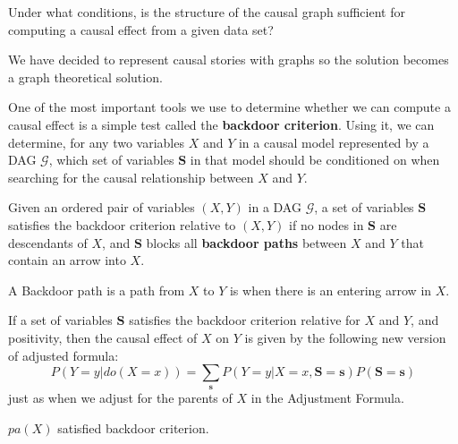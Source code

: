 \begin{center}
      Under what conditions, is the structure of the causal graph sufficient for
      computing a causal effect from a given data set?
\end{center}

We have decided to represent causal stories with graphs so the solution becomes
a graph theoretical solution.

One of the most important tools we use to determine whether we can compute a
causal effect is a simple test called the \textbf{backdoor criterion}. Using it,
we can determine, for any two variables $X$ and $Y$ in a causal model represented
by a DAG $\mathcal{G}$, which set of variables $\mathbf{S}$ in that model should
be conditioned on when searching for the causal relationship between $X$ and $Y$.

\begin{definition}
      Given an ordered pair of variables $(X, Y)$ in a DAG $\mathcal{G}$, a set
      of variables $\mathbf{S}$ satisfies the backdoor criterion relative to $(X, Y)$
      if no nodes in $\mathbf{S}$ are descendants of $X$, and $\mathbf{S}$ blocks
      all \textbf{backdoor paths} between $X$ and $Y$ that contain an arrow into $X$.
\end{definition}
\begin{definition}
      A Backdoor path is a path from $X$ to $Y$ is when there is an entering arrow
      in $X$.
\end{definition}
\begin{definition}
      If a set of variables $\mathbf{S}$ satisfies the backdoor criterion relative
      for $X$ and $Y$, and positivity, then the causal effect of $X$ on $Y$ is
      given by the following new version of adjusted formula:
      \begin{equation}
            P(Y = y| do(X = x)) = \sum_{\mathbf{s}} P(Y = y| X = x, \mathbf{S} = \mathbf{s})P(\mathbf{S} = \mathbf{s})
      \end{equation}
      just as when we adjust for the parents of $X$ in the Adjustment Formula.
\end{definition}
\begin{note}
      $pa(X)$ satisfied backdoor criterion.
\end{note}

